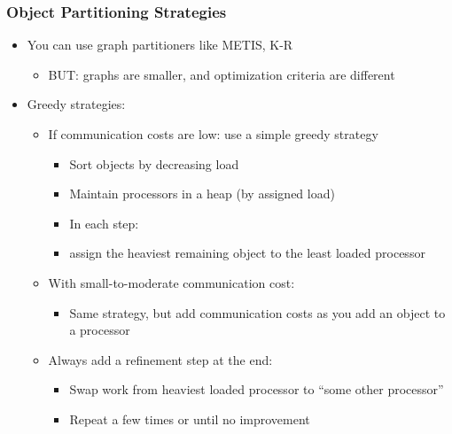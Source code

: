 \begin{frame}[fragile]
\frametitle{Object Partitioning Strategies}

\begin{itemize}

\item You can use graph partitioners like METIS, K-R
 \begin{itemize}
  \item BUT: graphs are smaller, and optimization criteria are different
 \end{itemize}

 \item Greedy strategies:

 \begin{itemize}
  \item If communication costs are low: use a simple greedy strategy

  \begin{itemize}
   \item Sort objects by decreasing load
   \item Maintain processors in a heap (by assigned load)
   \item In each step:
   \item assign the heaviest remaining object to the least loaded processor
  \end{itemize}

  \item With small-to-moderate communication cost:
  \begin{itemize}
   \item Same strategy, but add communication costs as you add an object to a processor
  \end{itemize}

  \item Always add a refinement step at the end:
  \begin{itemize}
   \item Swap work from heaviest loaded processor to ``some other processor''
   \item Repeat a few times or until no improvement 
  \end{itemize}

 \end{itemize}

 \end{itemize}
\end{frame}


